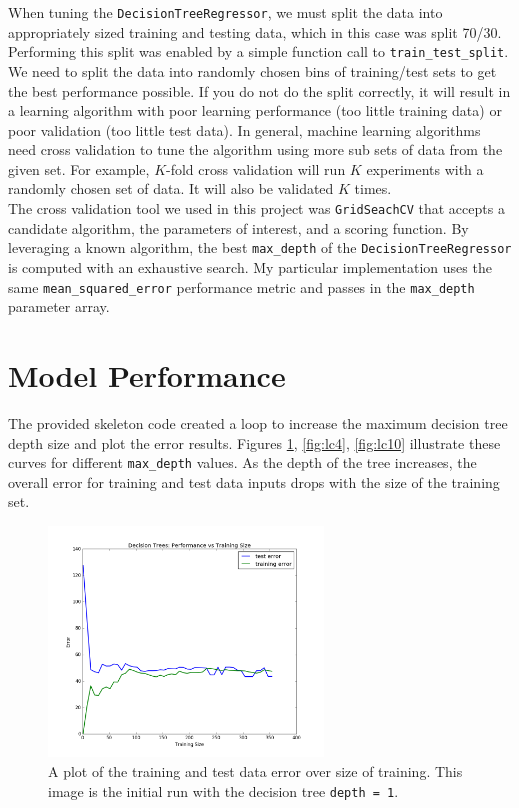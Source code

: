 \documentclass[12pt,letterpaper]{article}
\begin{document}
When tuning the \texttt{DecisionTreeRegressor}, we must split the data into appropriately sized training and testing data, which in this case was split 70/30.
Performing this split was enabled by a simple function call to \verb|train_test_split|.
We need to split the data into randomly chosen bins of training/test sets to get the best performance possible.
If you do not do the split correctly, it will result in a learning algorithm with poor learning performance (too little training data) or poor validation (too little test data).
In general, machine learning algorithms need cross validation to tune the algorithm using more sub sets of data from the given set.
For example, $K$-fold cross validation will run $K$ experiments with a randomly chosen set of data.
It will also be validated $K$ times. \\

The cross validation tool we used in this project was \verb|GridSeachCV| that accepts a candidate algorithm, the parameters of interest, and a scoring function.
By leveraging a known algorithm, the best \verb|max_depth| of the \verb|DecisionTreeRegressor| is computed with an exhaustive search.
My particular implementation uses the same \verb|mean_squared_error| performance metric and passes in the \verb|max_depth| parameter array.

\section*{Model Performance}

The provided skeleton code created a loop to increase the maximum decision tree depth size and plot the error results. 
Figures \ref{fig:lc1}, \ref{fig:lc4}, \ref{fig:lc10} illustrate these curves for different \verb|max_depth| values.
As the depth of the tree increases, the overall error for training and test data inputs drops with the size of the training set.

\begin{figure}[h!]
	\centering
	\includegraphics[width=0.65\textwidth]{dt-learningcurve-1.png}
	\caption{A plot of the training and test data error over size of training. This image is the initial run with the decision tree \texttt{depth = 1}.}
	\label{fig:lc1}
\end{figure}
\end{document}
